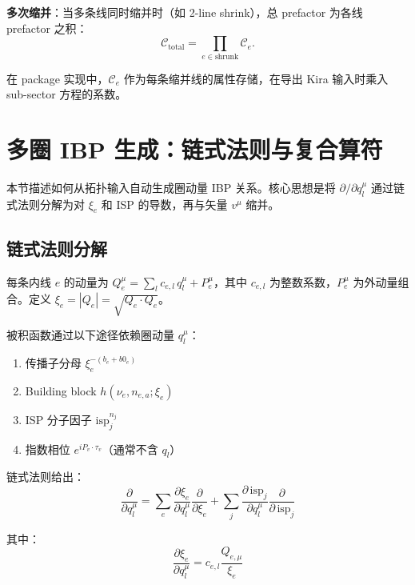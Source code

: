 ﻿\documentclass[a4paper,11pt]{article}
\begin{document}
\textbf{多次缩并}：当多条线同时缩并时（如 2-line shrink），总 prefactor 为各线 prefactor 之积：
\begin{equation}
  \mathcal{C}_{\text{total}} = \prod_{e \in \text{shrunk}} \mathcal{C}_e.
  \label{prefactorTotal}
\end{equation}

在 package 实现中，$\mathcal{C}_e$ 作为每条缩并线的属性存储，在导出 Kira 输入时乘入 sub-sector 方程的系数。

\section{多圈 IBP 生成：链式法则与复合算符}

本节描述如何从拓扑输入自动生成圈动量 IBP 关系。核心思想是将 $\partial/\partial q_l^\mu$ 通过链式法则分解为对 $\xi_e$ 和 ISP 的导数，再与矢量 $v^\mu$ 缩并。

\subsection{链式法则分解}

每条内线 $e$ 的动量为 $Q_e^\mu = \sum_l c_{e,l}\, q_l^\mu + P_e^\mu$，其中 $c_{e,l}$ 为整数系数，$P_e^\mu$ 为外动量组合。定义 $\xi_e = |Q_e| = \sqrt{Q_e \cdot Q_e}$。

被积函数通过以下途径依赖圈动量 $q_l^\mu$：
\begin{enumerate}
  \item 传播子分母 $\xi_e^{-(b_e + b0_e)}$
  \item Building block $h(\nu_e, n_{e,a}; \xi_e)$
  \item ISP 分子因子 $\text{isp}_j^{n_j}$
  \item 指数相位 $e^{i P_v \cdot \tau_v}$（通常不含 $q_l$）
\end{enumerate}

链式法则给出：
\begin{equation}
  \frac{\partial}{\partial q_l^\mu} = \sum_e \frac{\partial \xi_e}{\partial q_l^\mu} \frac{\partial}{\partial \xi_e} + \sum_j \frac{\partial\, \text{isp}_j}{\partial q_l^\mu} \frac{\partial}{\partial\, \text{isp}_j}
\end{equation}

其中：
\begin{equation}
  \frac{\partial \xi_e}{\partial q_l^\mu} = c_{e,l} \frac{Q_{e,\mu}}{\xi_e}
\end{equation}
\end{document}
